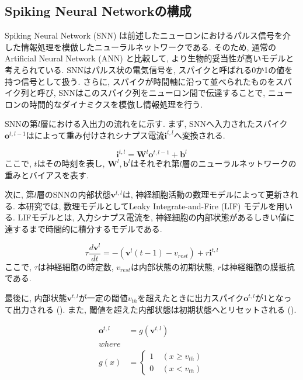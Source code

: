 \subsection{Spiking Neural Networkの構成}

Spiking Neural Network (SNN) は前述したニューロンにおけるパルス信号を介した情報処理を模倣したニューラルネットワークである.
そのため, 通常のArtificial Neural Network (ANN) と比較して, より生物的妥当性が高いモデルと考えられている.
SNNはパルス状の電気信号を, スパイクと呼ばれる0か1の値を持つ信号として扱う.
さらに, スパイクが時間軸に沿って並べられたものをスパイク列と呼び, SNNはこのスパイク列をニューロン間で伝達することで, ニューロンの時間的なダイナミクスを模倣し情報処理を行う.

SNNの第$l$層における入出力の流れをに示す.
まず, SNNへ入力されたスパイク$\bm{o}^{t, l-1}$はによって重み付けされシナプス電流$\bm{i}^{t,l}$へ変換される.

\begin{equation}
    \bm{i}^{t, l} = \bm{W}^l\bm{o}^{t, l-1} + \bm{b}^l
    \label{eq:input_spike}
\end{equation}
ここで, $t$はその時刻を表し, $\bm{W}^l, \bm{b}^l$はそれぞれ第$l$層のニューラルネットワークの重みとバイアスを表す.

次に, 第$l$層のSNNの内部状態$\bm{v}^{t, l}$は, 神経細胞活動の数理モデルによって更新される.
本研究では, 数理モデルとしてLeaky Integrate-and-Fire (LIF) モデルを用いる.
LIFモデルとは, 入力シナプス電流を, 神経細胞の内部状態があるしきい値に達するまで時間的に積分するモデルである.

\begin{equation}
    {\tau}\frac{d\bm{v}^l}{dt}=-\left(\bm{v}^l\left({t-1}\right)-v_{rest}\right)+r\bm{i}^{t, l}
    \label{eq:lif}
\end{equation}
ここで, $\tau$は神経細胞の時定数, $v_{rest}$は内部状態の初期状態, $r$は神経細胞の膜抵抗である.

最後に, 内部状態$\bm{v}^{t, l}$が一定の閾値$v_{th}$を超えたときに出力スパイク$\bm{o}^{t, l}$が1となって出力される ().
また, 閾値を超えた内部状態は初期状態へとリセットされる ().

\begin{equation}
    \begin{split}
      \bm{o}^{t, l}&=g\left(\bm{v}^{t, l}\right)\\
    where\\
    g\left(x\right)&=\left\{
      \begin{alignedat}{2}
        1 &\:\left(x{\geq}v_{th}\right)\\
        0 &\:\left(x{<}v_{th}\right)
      \end{alignedat}
    \right. 
    \end{split} \label{eq:outputSpike}
  \end{equation}

